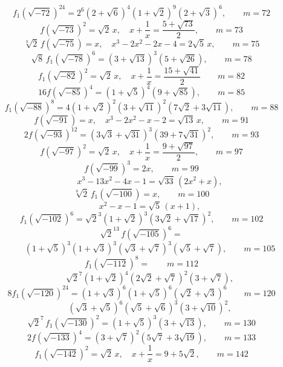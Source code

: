 
\[ f_1(\sqrt{-72})^{24} = 2^6(2+\sqrt6)^4(1+\sqrt2)^9(2+\sqrt3)^6, \qquad m = 72 \]
\[ f(\sqrt{-73})^2 = \sqrt2\,x, \quad x + \frac{1}{x} = \frac{5+\sqrt{73}}{2}, \qquad m = 73 \]
\[ \sqrt[3]{2}\,f(\sqrt{-75}) = x, \quad x^3 - 2x^2 - 2x - 4 = 2\sqrt5\,x, \qquad m = 75 \]
\[ \sqrt8\,f_1(\sqrt{-78})^6 = (3+\sqrt{13})^3(5+\sqrt{26}), \qquad m = 78 \]
\[ f_1(\sqrt{-82})^2 = \sqrt2\,x, \quad x + \frac{1}{x} = \frac{15+\sqrt{41}}{2} \qquad m = 82 \]
\[ 16f(\sqrt{-85})^4 = (1+\sqrt5)^4(9+\sqrt{85}), \qquad m = 85 \]
\[ f_1(\sqrt{-88})^8 = 4(1+\sqrt2)^2(3+\sqrt{11})^2(7\sqrt2+3\sqrt{11}), \qquad m = 88 \]
\[ f(\sqrt{-91}) = x, \quad x^3 - 2x^2 - x - 2 = \sqrt{13}\,x, \qquad m = 91 \]
\[ 2f(\sqrt{-93})^{12} = (3\sqrt3+\sqrt{31})^3(39+7\sqrt{31})^2, \qquad m = 93 \]
\[ f(\sqrt{-97})^2 = \sqrt2\,x, \quad x + \frac{1}{x} = \frac{9+\sqrt{97}}{2}, \qquad m = 97 \]
\[ f(\sqrt{-99})^3 = 2x, \qquad m = 99 \]
\[ \qquad x^3 - 13x^2 - 4x - 1 = \sqrt{33}\,(2x^2+x), \]
\[ \sqrt[8]{2}\,f_1(\sqrt{-100}) = x, \qquad m = 100 \]
\[ \qquad x^2 - x - 1 = \sqrt5\,(x+1), \]
\[ f_1(\sqrt{-102})^6 = \sqrt2^3(1+\sqrt2)^3(3\sqrt2+\sqrt{17})^2, \qquad m = 102 \]
\[ \sqrt2^{13}\,f(\sqrt{-105})^6 = \]
\[ \qquad (1+\sqrt5)^3(1+\sqrt3)^3(\sqrt3+\sqrt7)^3(\sqrt5+\sqrt7), \qquad m = 105 \]
\[ f_1(\sqrt{-112})^8 = \qquad m = 112 \]
\[ \qquad \sqrt2^7(1+\sqrt2)^4(2\sqrt2+\sqrt7)^2(3+\sqrt7), \]
\[ 8f_1(\sqrt{-120})^{24} = (1+\sqrt3)^6(1+\sqrt5)^6(\sqrt2+\sqrt3)^6 \qquad m = 120 \]
\[ \qquad (\sqrt3+\sqrt5)^6(\sqrt5+\sqrt6)^3(3+\sqrt{10})^2, \]
\[ \sqrt2^7\,f_1(\sqrt{-130})^2 = (1+\sqrt5)^3(3+\sqrt{13}), \qquad m = 130 \]
\[ 2f(\sqrt{-133})^4 = (3+\sqrt7)^2(5\sqrt7+3\sqrt{19}), \qquad m = 133 \]
\[ f_1(\sqrt{-142})^2 = \sqrt2\,x, \quad x + \frac{1}{x} = 9 + 5\sqrt2, \qquad m = 142 \]
